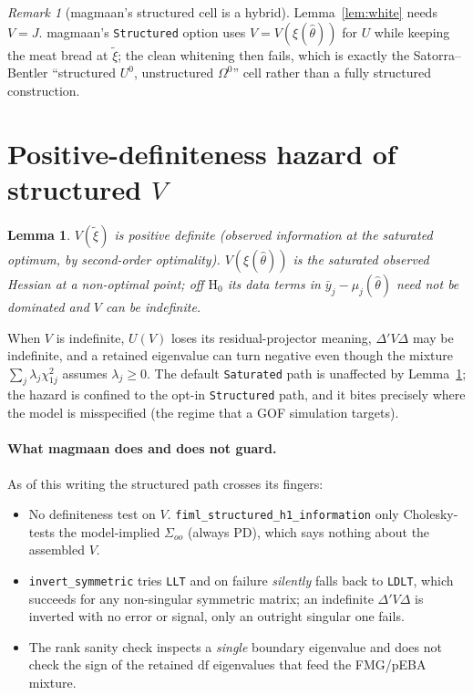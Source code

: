 \documentclass[11pt]{article}
\theoremstyle{plain}
\newtheorem{lemma}{Lemma}
\theoremstyle{remark}
\newtheorem*{remark}{Remark}
\begin{document}
\begin{remark}[magmaan's structured cell is a hybrid]
Lemma~\ref{lem:white} needs \(V=J\). magmaan's \texttt{Structured} option uses
\(V=V(\xi(\hat\theta))\) for \(U\) while keeping the meat bread at
\(\tilde\xi\); the clean whitening then fails, which is exactly the
Satorra--Bentler ``structured \(U^0\), unstructured \(\Omega^0\)'' cell rather
than a fully structured construction.
\end{remark}

\section*{Positive-definiteness hazard of structured \(V\)}
\label{sec:pd}

\begin{lemma}\label{lem:pd}
\(V(\tilde\xi)\) is positive definite (observed information at the saturated
optimum, by second-order optimality). \(V(\xi(\hat\theta))\) is the saturated
observed Hessian at a non-optimal point; off \(\mathrm{H}_0\) its data terms in
\(\bar y_j-\mu_j(\hat\theta)\) need not be dominated and \(V\) can be indefinite.
\end{lemma}

When \(V\) is indefinite, \(U(V)\) loses its residual-projector meaning,
\(\Delta'V\Delta\) may be indefinite, and a retained eigenvalue can turn
negative even though the mixture \(\sum_j\lambda_j\chi^2_{1j}\) assumes
\(\lambda_j\ge 0\). The default \texttt{Saturated} path is unaffected by
Lemma~\ref{lem:pd}; the hazard is confined to the opt-in \texttt{Structured}
path, and it bites precisely where the model is misspecified (the regime that a
GOF simulation targets).

\paragraph{What magmaan does and does not guard.} As of this writing the
structured path crosses its fingers:
\begin{itemize}
\item No definiteness test on \(V\). \verb|fiml_structured_h1_information| only
Cholesky-tests the model-implied \(\Sigma_{oo}\) (always PD), which says nothing
about the assembled \(V\).
\item \verb|invert_symmetric| tries \verb|LLT| and on failure \emph{silently}
falls back to \verb|LDLT|, which succeeds for any non-singular symmetric matrix;
an indefinite \(\Delta'V\Delta\) is inverted with no error or signal, only an
outright singular one fails.
\item The rank sanity check inspects a \emph{single} boundary eigenvalue and
does not check the sign of the retained \(\mathrm{df}\) eigenvalues that feed the
FMG/pEBA mixture.
\end{itemize}
\end{document}
